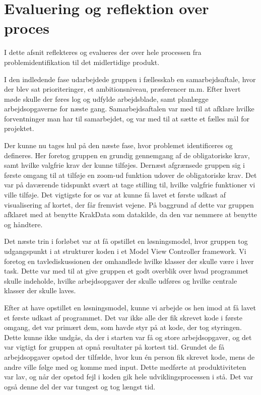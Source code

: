 \section{Evaluering og reflektion over proces}
\label{sec:evaluering_og_reflektion_over_proces}

I dette afsnit reflekteres og evalueres der over hele processen fra problemidentifikation til det midlertidige produkt. 

I den indledende fase udarbejdede gruppen i fællesskab en samarbejdsaftale, hvor der blev sat prioriteringer, et ambitionsniveau, præferencer m.m. Efter hvert møde skulle der føres log og udfylde arbejdsblade, samt planlægge arbejdsopgaverne for næste gang. Samarbejdsaftalen var med til at afklare hvilke forventninger man har til samarbejdet, og var med til at sætte et fælles mål for projektet.


Der kunne nu tages hul på den næste fase, hvor problemet identificeres og defineres. Her foretog gruppen en grundig gennemgang af de obligatoriske krav, samt hvilke valgfrie krav der kunne tilføjes.  Dernæst afgrænsede gruppen sig i første omgang til at tilføje en zoom-ud funktion udover de obligatoriske krav. Det var på daværende tidspunkt svært at tage stilling til, hvilke valgfrie funktioner vi ville tilføje. Det vigtigste for os var at kunne få lavet et første udkast af visualisering af kortet, der får fremvist vejene. På baggrund af dette var gruppen afklaret med at benytte KrakData som datakilde, da den var nemmere at benytte og håndtere.   


Det næste trin i forløbet var at få opstillet en løsningsmodel, hvor gruppen tog udgangspunkt i at strukturer koden i et Model View Controller framework. Vi foretog en tavlediskussionen der omhandlede hvilke klasser der skulle være i hver task. Dette var med til at give gruppen et godt overblik over hvad programmet skulle indeholde, hvilke arbejdsopgaver der skulle udføres og hvilke centrale klasser der skulle laves. 


Efter at have opstillet en løsningsmodel, kunne vi arbejde os hen imod at få lavet et første udkast af programmet. Det var ikke alle der fik skrevet kode i første omgang, det var primært dem, som havde styr på at kode, der tog styringen. Dette kunne ikke undgås, da der i starten var få og store arbejdsopgaver, og det var vigtigt for gruppen at opnå resultater på kortest tid. Grundet de få arbejdsopgaver opstod der tilfælde, hvor kun én person fik skrevet kode, mens de andre ville følge med og komme med input. Dette medførte at produktiviteten var lav, og når der opstod fejl i koden gik hele udviklingsprocessen i stå. Det var også denne del der var tungest og tog længst tid. 


